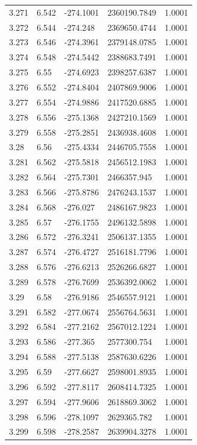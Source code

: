 \begin{tabular}{lllll}
3.271 & 6.542 & -274.1001 & 2360190.7849 & 1.0001 \\
3.272 & 6.544 & -274.248 & 2369650.4744 & 1.0001 \\
3.273 & 6.546 & -274.3961 & 2379148.0785 & 1.0001 \\
3.274 & 6.548 & -274.5442 & 2388683.7491 & 1.0001 \\
3.275 & 6.55 & -274.6923 & 2398257.6387 & 1.0001 \\
3.276 & 6.552 & -274.8404 & 2407869.9006 & 1.0001 \\
3.277 & 6.554 & -274.9886 & 2417520.6885 & 1.0001 \\
3.278 & 6.556 & -275.1368 & 2427210.1569 & 1.0001 \\
3.279 & 6.558 & -275.2851 & 2436938.4608 & 1.0001 \\
3.28 & 6.56 & -275.4334 & 2446705.7558 & 1.0001 \\
3.281 & 6.562 & -275.5818 & 2456512.1983 & 1.0001 \\
3.282 & 6.564 & -275.7301 & 2466357.945 & 1.0001 \\
3.283 & 6.566 & -275.8786 & 2476243.1537 & 1.0001 \\
3.284 & 6.568 & -276.027 & 2486167.9823 & 1.0001 \\
3.285 & 6.57 & -276.1755 & 2496132.5898 & 1.0001 \\
3.286 & 6.572 & -276.3241 & 2506137.1355 & 1.0001 \\
3.287 & 6.574 & -276.4727 & 2516181.7796 & 1.0001 \\
3.288 & 6.576 & -276.6213 & 2526266.6827 & 1.0001 \\
3.289 & 6.578 & -276.7699 & 2536392.0062 & 1.0001 \\
3.29 & 6.58 & -276.9186 & 2546557.9121 & 1.0001 \\
3.291 & 6.582 & -277.0674 & 2556764.5631 & 1.0001 \\
3.292 & 6.584 & -277.2162 & 2567012.1224 & 1.0001 \\
3.293 & 6.586 & -277.365 & 2577300.754 & 1.0001 \\
3.294 & 6.588 & -277.5138 & 2587630.6226 & 1.0001 \\
3.295 & 6.59 & -277.6627 & 2598001.8935 & 1.0001 \\
3.296 & 6.592 & -277.8117 & 2608414.7325 & 1.0001 \\
3.297 & 6.594 & -277.9606 & 2618869.3062 & 1.0001 \\
3.298 & 6.596 & -278.1097 & 2629365.782 & 1.0001 \\
3.299 & 6.598 & -278.2587 & 2639904.3278 & 1.0001 \\

\end{tabular}
